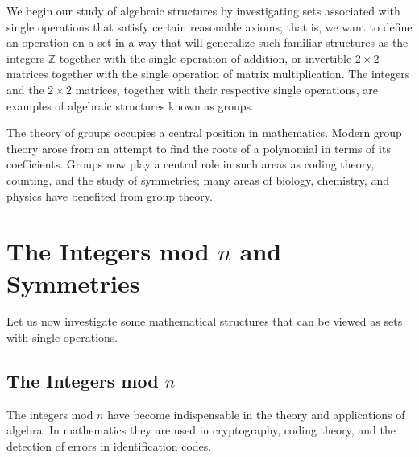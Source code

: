 


We begin our study of  algebraic structures by investigating sets associated with single operations that satisfy certain reasonable axioms; that is, we want to define an operation on a set in a way that will generalize such familiar structures as the integers ${\mathbb Z}$ together with the single operation of  addition, or invertible $2 \times 2$ matrices together with the single operation of matrix multiplication.  The integers and the $2 \times 2$ matrices, together with their respective single operations, are examples of algebraic structures known as groups. 

The theory of groups occupies a central position in mathematics.  Modern group theory arose from an attempt to find the roots of a polynomial in terms of its coefficients.  Groups now play a central role in such areas as coding theory, counting, and the study of  symmetries; many areas of biology, chemistry, and physics have benefited from group theory.

 
\section{The Integers mod $n$ and Symmetries}\label{Section_mod_N_sym}
 
Let us now investigate some mathematical structures that can be viewed as sets with single operations. 
 
 
\subsection*{The Integers mod $n$}

The integers mod $n$ have become indispensable in the theory and applications of algebra.  In mathematics they are used in cryptography, coding theory, and the detection of errors in identification codes.
 
